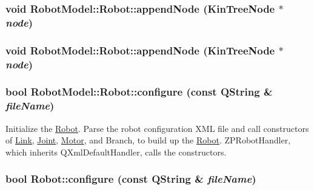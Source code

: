 \label{class_robot_model_1_1_robot_aa4db18e00b4e4c56a37943a0b45d1c3b}
\hypertarget{class_robot_model_1_1_robot_aa6a72690fe4b0d1a2178f5478d3829bf}{
\subsubsection[{appendNode}]{\setlength{\rightskip}{0pt plus 5cm}void RobotModel::Robot::appendNode ({\bf KinTreeNode} $\ast$ {\em node})}}
\label{class_robot_model_1_1_robot_aa6a72690fe4b0d1a2178f5478d3829bf}
\hypertarget{class_robot_model_1_1_robot_aa6a72690fe4b0d1a2178f5478d3829bf}{
\subsubsection[{appendNode}]{\setlength{\rightskip}{0pt plus 5cm}void RobotModel::Robot::appendNode ({\bf KinTreeNode} $\ast$ {\em node})}}
\label{class_robot_model_1_1_robot_aa6a72690fe4b0d1a2178f5478d3829bf}
\hypertarget{class_robot_model_1_1_robot_af54a14845b7e3ee6c4103790df71568e}{
\subsubsection[{configure}]{\setlength{\rightskip}{0pt plus 5cm}bool RobotModel::Robot::configure (const QString \& {\em fileName})}}
\label{class_robot_model_1_1_robot_af54a14845b7e3ee6c4103790df71568e}


Initialize the \hyperlink{class_robot_model_1_1_robot}{Robot}. Parse the robot configuration XML file and call constructors of \hyperlink{class_robot_model_1_1_link}{Link}, \hyperlink{class_robot_model_1_1_joint}{Joint}, \hyperlink{class_robot_model_1_1_motor}{Motor}, and Branch, to build up the \hyperlink{class_robot_model_1_1_robot}{Robot}. ZPRobotHandler, which inherits QXmlDefaultHandler, calls the constructors. \hypertarget{class_robot_model_1_1_robot_a9ca9887b212f3233d101d95854cf2c79}{
\subsubsection[{configure}]{\setlength{\rightskip}{0pt plus 5cm}bool Robot::configure (const QString \& {\em fileName})}}
\label{class_robot_model_1_1_robot_a9ca9887b212f3233d101d95854cf2c79}


